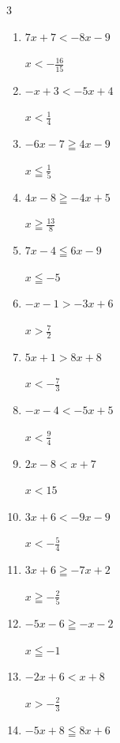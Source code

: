 \begin{multicols}{3}
\begin{enumerate}
        $\displaystyle x<\frac{4}{3}$

  \item $7x+7<-8x-9$

        $\displaystyle x<-\frac{16}{15}$

  \item $-x+3<-5x+4$

        $\displaystyle x<\frac{1}{4}$

  \item $-6x-7\geqq 4x-9$

        $\displaystyle x\leqq \frac{1}{5}$

  \item $4x-8\geqq -4x+5$

        $\displaystyle x\geqq \frac{13}{8}$

  \item $7x-4\leqq 6x-9$

        $\displaystyle x\leqq -5$

  \item $-x-1>-3x+6$

        $\displaystyle x>\frac{7}{2}$

  \item $5x+1>8x+8$

        $\displaystyle x<-\frac{7}{3}$

  \item $-x-4<-5x+5$

        $\displaystyle x<\frac{9}{4}$

  \item $2x-8<x+7$

        $\displaystyle x<15$

  \item $3x+6<-9x-9$

        $\displaystyle x<-\frac{5}{4}$

  \item $3x+6\geqq -7x+2$

        $\displaystyle x\geqq -\frac{2}{5}$

  \item $-5x-6\geqq -x-2$

        $\displaystyle x\leqq -1$

\columnbreak %

  \item $-2x+6<x+8$

        $\displaystyle x>-\frac{2}{3}$

  \item $-5x+8\leqq 8x+6$


\end{enumerate}
\end{multicols}
